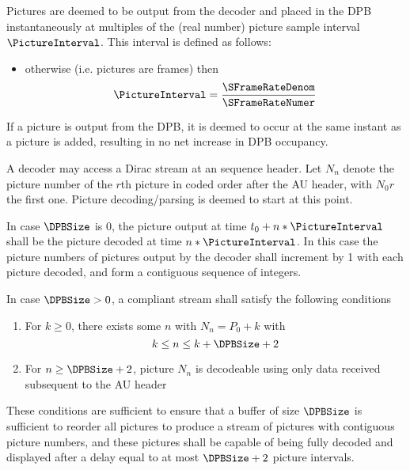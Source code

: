 Pictures are deemed to be output from the decoder and placed in the DPB instantaneously at multiples
of the (real number) picture sample interval $\PictureInterval$. This interval is defined as follows:
\begin{itemize}
\item otherwise (i.e. pictures are frames) then 
\begin{equation*}
\PictureInterval=\dfrac{\SFrameRateDenom}{\SFrameRateNumer}
\end{equation*}
\end{itemize}

If a picture is output from the DPB, it is deemed to occur at the same instant as a picture is
added, resulting in no net increase in DPB occupancy.

A decoder may access a Dirac stream at an sequence header. Let $N_n$ denote
the picture number of the $r$th picture in coded order after
the AU header, with $N_0r$ the first one. Picture decoding/parsing 
is deemed to start at this point. 

In case $\DPBSize$ is 0, the picture output at time $t_0+n*\PictureInterval$
shall be the picture decoded at time $n*\PictureInterval$. In this case
the picture numbers of pictures output by the decoder shall increment
by 1 with each picture decoded, and form a contiguous sequence of integers.

In case $\DPBSize>0$, a compliant stream shall satisfy the following
conditions
\begin{enumerate}
\item For $k\geq 0$, there exists some $n$ with $N_n=P_0+k$ with
\[k\leq n\leq k+\DPBSize+2\]
\item For $n\geq\DPBSize+2$, picture $N_n$ is decodeable 
using only data received subsequent to the AU header
\end{enumerate}

These conditions are sufficient to ensure that a buffer of size $\DPBSize$
is sufficient to reorder all pictures to produce a stream of pictures
with contiguous picture numbers, and these pictures shall be capable of being fully 
decoded and displayed after a delay equal to at most $\DPBSize+2$ picture intervals.

